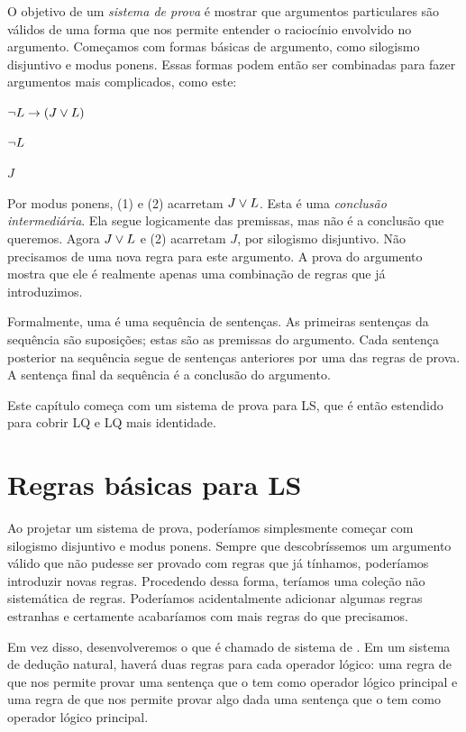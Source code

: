 O objetivo de um \emph{sistema de prova} é mostrar que argumentos particulares são válidos de uma forma que nos permite entender o raciocínio envolvido no argumento. Começamos com formas básicas de argumento, como silogismo disjuntivo e modus ponens. Essas formas podem então ser combinadas para fazer argumentos mais complicados, como este:
\begin{earg}
\item[(1)] $\neg L \rightarrow (J \vee L)$
\item[(2)] $\neg L$
\item[\therefore] $J$
\end{earg}
Por modus ponens, (1) e (2) acarretam $J \vee L$. Esta é uma \emph{conclusão intermediária}. Ela segue logicamente das premissas, mas não é a conclusão que queremos. Agora $J \vee L$ e (2) acarretam $J$, por silogismo disjuntivo. Não precisamos de uma nova regra para este argumento. A prova do argumento mostra que ele é realmente apenas uma combinação de regras que já introduzimos.

Formalmente, uma  é uma sequência de sentenças. As primeiras sentenças da sequência são suposições; estas são as premissas do argumento. Cada sentença posterior na sequência segue de sentenças anteriores por uma das regras de prova. A sentença final da sequência é a conclusão do argumento.

Este capítulo começa com um sistema de prova para LS, que é então estendido para cobrir LQ e LQ mais identidade.


\section{Regras básicas para LS}

Ao projetar um sistema de prova, poderíamos simplesmente começar com silogismo disjuntivo e modus ponens. Sempre que descobríssemos um argumento válido que não pudesse ser provado com regras que já tínhamos, poderíamos introduzir novas regras. Procedendo dessa forma, teríamos uma coleção não sistemática de regras. Poderíamos acidentalmente adicionar algumas regras estranhas e certamente acabaríamos com mais regras do que precisamos.

Em vez disso, desenvolveremos o que é chamado de sistema de . Em um sistema de dedução natural, haverá duas regras para cada operador lógico: uma regra de  que nos permite provar uma sentença que o tem como operador lógico principal e uma regra de  que nos permite provar algo dada uma sentença que o tem como operador lógico principal.

